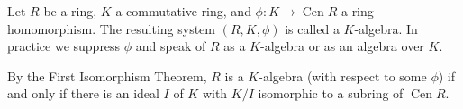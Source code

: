 Let $R$ be a ring, $K$ a commutative ring, and $\phi: K \rightarrow \operatorname{Cen} R$ a ring homomorphism. The resulting system $(R, K, \phi)$ is called a $K$-algebra. In practice we suppress $\phi$ and speak of $R$ as a $K$-algebra or as an algebra over $K$.

By the First Isomorphism Theorem, $R$ is a $K$-algebra (with respect to some $\phi$) if and only if there is an ideal $I$ of $K$ with $K/I$ isomorphic to a subring of $\operatorname{Cen} R$.
